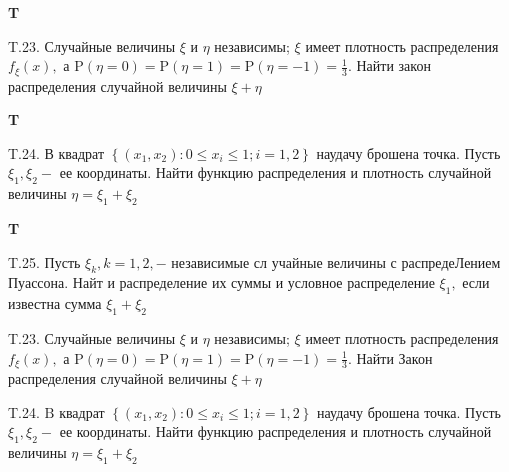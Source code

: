 \documentclass[a4paper,12pt]{article} %
\begin{document}
\begin{example}\textbf{T}

T.23. Случайные величины $\xi$ и $\eta$ независимы; $\xi$ имеет плотность распределения $f_{\xi}(x),$ а $\mathrm{P}(\eta=0)=\mathrm{P}(\eta=1)=\mathrm{P}(\eta=-1)=\frac{1}{3} .$ Найти закон
распределения случайной величины $\xi+\eta$


\end{example}




\begin{example}\textbf{T}

T.24. В квадрат $\left\{\left(x_{1}, x_{2}\right): 0 \leqslant x_{i} \leqslant 1 ; i=1,2\right\}$ наудачу брошена точка. Пусть $\xi_{1}, \xi_{2}-$ ее координаты. Найти функцию распределения и плотность случайной величины $\eta=\xi_{1}+\xi_{2}$


\end{example}


\begin{example}\textbf{T}

T.25. Пусть $\xi_{k}, k=1,2,-$ независимые сл учайные величины с распредеЛением Пуассона. Найт и распределение их суммы и условное распределение $\xi_{1},$ если известна сумма $\xi_{1}+\xi_{2}$


\end{example}



\begin{example}

T.23. Случайные величины $\xi$ и $\eta$ независимы; $\xi$ имеет плотность распределения $f_{\xi}(x),$ а $\mathrm{P}(\eta=0)=\mathrm{P}(\eta=1)=\mathrm{P}(\eta=-1)=\frac{1}{3} .$ Найти Закон
распределения случайной величины $\xi+\eta$




\end{example}



\begin{example}

T.24. $\mathrm{B}$ квадрат $\left\{\left(x_{1}, x_{2}\right): 0 \leqslant x_{i} \leqslant 1 ; i=1,2\right\}$ наудачу брошена точка. Пусть $\xi_{1}, \xi_{2}-$ ее координаты. Найти функцию распределения и плотность случайной величины $\eta=\xi_{1}+\xi_{2}$




\end{example}
\end{document}

